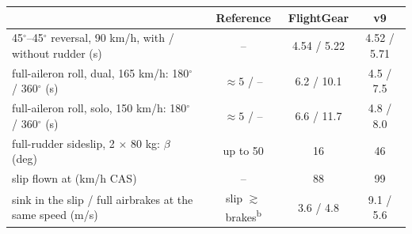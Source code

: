 \begin{tabular}{lccc}
\toprule
 & Reference & FlightGear & v9 \\
\midrule
45$^\circ$--45$^\circ$ reversal, 90 km/h, with / without rudder (s) & -- & 4.54 / 5.22 & 4.52 / 5.71 \\
full-aileron roll, dual, 165 km/h: 180$^\circ$ / 360$^\circ$ (s) & $\approx 5$ / -- & 6.2 / 10.1 & 4.5 / 7.5 \\
full-aileron roll, solo, 150 km/h: 180$^\circ$ / 360$^\circ$ (s) & $\approx 5$ / -- & 6.6 / 11.7 & 4.8 / 8.0 \\
full-rudder sideslip, 2 $\times$ 80 kg: $\beta$ (deg) & up to 50 & 16 & 46 \\
\quad slip flown at (km/h CAS) & -- & 88 & 99 \\
\quad sink in the slip / full airbrakes at the same speed (m/s) & slip $\gtrsim$ brakes\textsuperscript{b} & 3.6 / 4.8 & 9.1 / 5.6 \\
\bottomrule
\end{tabular}
